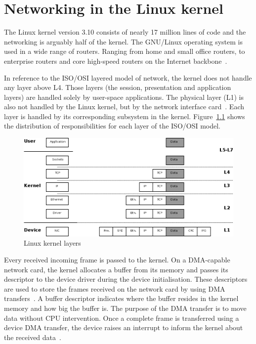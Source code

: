 
\chapter{Networking in the Linux kernel}\label{chap:linux}
The Linux kernel version 3.10 consists of nearly 17 million lines of code
and the networking is arguably half of the kernel.
The GNU/Linux operating system is used in a wide range of routers.
Ranging from home and small office routers, to enterprise routers and
core high-speed routers on the Internet backbone~\cite{linux-by-numbers}.

In reference to the ISO/OSI layered model of network,
the kernel does not handle any layer above L4.
Those layers (the session, presentation and application layers) are
handled solely by user-space applications.
The physical layer (L1) is also not handled by the Linux kernel,
but by the network interface card~\cite{linux-kernel-networking}.
Each layer is handled by its corresponding subsystem in the kernel.
Figure~\ref{fig:linux-layers} shows the distribution of responsibilities for each layer of the ISO/OSI model.

\begin{figure}[H]
	\bigskip
	\centering
	\includegraphics[width=14cm,keepaspectratio]{fig/layers.png}
	\caption{Linux kernel layers}
	\label{fig:linux-layers}
	\bigskip
\end{figure}

Every received incoming frame is passed to the kernel.
On a DMA-capable network card, the kernel allocates a buffer from its memory and passes its descriptor to the
device driver during the device initialisation.
These descriptors are used to store the frames received on the network card by using DMA transfers~\cite{tcpip-in-linux}.
A buffer descriptor indicates where the buffer resides in the kernel memory and how big the buffer is.
The purpose of the DMA transfer is to move data without CPU intervention.
Once a complete frame is transferred using a device DMA transfer,
the device raises an interrupt to inform the kernel about the received data~\cite{tcpip-in-linux}.


